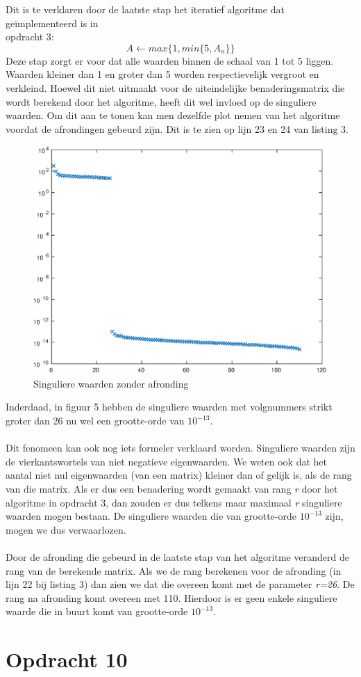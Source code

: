 \documentclass[11pt,a4paper]{article}
\begin{document}
Dit is te verklaren door de laatste stap het iteratief algoritme dat geïmplementeerd is in \\opdracht 3:
$$A \leftarrow max\{1,min\{5,A_{\kappa}\}\}$$
Deze stap zorgt er voor dat alle waarden binnen de schaal van 1 tot 5 liggen. Waarden kleiner dan 1 en groter dan 5 worden respectievelijk vergroot en verkleind. Hoewel dit niet uitmaakt voor de uiteindelijke benaderingsmatrix die wordt berekend door het algoritme, heeft dit wel invloed op de singuliere waarden. Om dit aan te tonen kan men dezelfde plot nemen van het algoritme voordat de afrondingen gebeurd zijn. Dit is te zien op lijn 23 en 24 van listing 3. 
\begin{figure}[H]
\centering
\includegraphics[scale=0.55]{opdracht9b}
\caption{Singuliere waarden zonder afronding}
\end{figure}
Inderdaad, in figuur 5 hebben de singuliere waarden met volgnummers strikt groter dan 26 nu wel een grootte-orde van $10^{-13}$.\\
\\
Dit fenomeen kan ook nog iets formeler verklaard worden. Singuliere waarden zijn de vierkantswortels van niet negatieve eigenwaarden. We weten ook dat het aantal niet nul eigenwaarden (van een matrix) kleiner dan of gelijk is, als de rang van die matrix.
Als er dus een benadering wordt gemaakt van rang \textit{r} door het algoritme in opdracht 3, dan zouden er dus telkens maar maximaal \textit{r} singuliere waarden mogen bestaan. De singuliere waarden die van grootte-orde $10^{-13}$ zijn, mogen we dus verwaarlozen.
\\
\\
Door de afronding die gebeurd in de laatste stap van het algoritme veranderd de rang van de berekende matrix. Als we de rang berekenen voor de afronding (in lijn 22 bij listing 3) dan zien we dat die overeen komt met de parameter \textit{r=26}. De rang na afronding komt overeen met 110. Hierdoor is er geen enkele singuliere waarde die in buurt komt van grootte-orde $10^{-13}$.



\section*{Opdracht 10}


\end{document}
